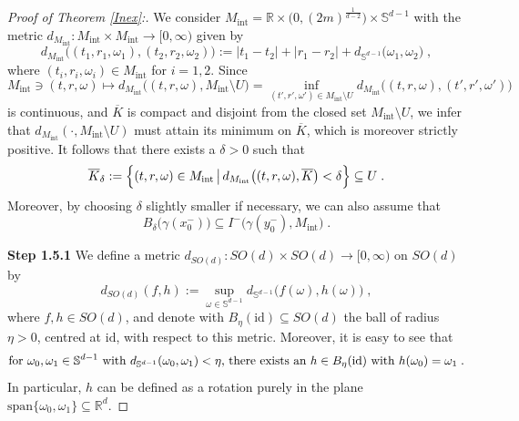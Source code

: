 \documentclass[reqno]{article}
\newcommand{\R}{\mathbb{R}}
\newcommand{\Sd}{\mathbb{S}^{d-1}}
\newcommand{\Mint}{M_{\mathrm{int}}}
\begin{document}
\begin{proof}[Proof of Theorem \ref{Inex}:]
We consider $\Mint = \R \times \big(0,(2m)^{\frac{1}{d-2}}\big) \times \Sd$ with the metric $d_{\Mint} : \Mint \times \Mint \to [0,\infty)$ given by
\begin{equation*}
d_{\Mint}\Big((t_1, r_1, \omega_1), (t_2, r_2, \omega_2)\Big) := |t_1 - t_2| + |r_1 - r_2| + d_{\Sd}\big(\omega_1, \omega_2\big) \;,
\end{equation*}
where $(t_i, r_i, \omega_i) \in \Mint$ for $i=1,2$. Since  
\begin{equation*}
\Mint \ni (t,r,\omega) \mapsto d_{\Mint}\big((t,r,\omega),\Mint \setminus U\big) = \inf\limits_{(t',r',\omega') \in \Mint \setminus U} d_{\Mint}\big((t,r,\omega),(t',r',\omega')\big)
\end{equation*}
is continuous, and $\overline{K}$ is compact and disjoint from the closed set $\Mint \setminus U$, we infer that $d_{\Mint}(\cdot, \Mint \setminus U)$ must attain its minimum on $\overline{K}$, which is moreover strictly positive. It follows that there exists a $\delta >0$ such that 
\begin{equation*}
\overline{K}_\delta := \Big{\{} (t,r,\omega) \in \Mint \, \big| \, d_{\Mint}\big((t,r,\omega), \overline{K}\big) < \delta \Big{\}} \subseteq U \;.
\end{equation*}
Moreover, by choosing $\delta $ slightly smaller if necessary, we can also assume that 
\begin{equation}
\label{RestrictionOnDelta}
B_\delta\big(\gamma(x^-_0)\big) \subseteq I^-\big(\gamma(y^-_0),\Mint\big)\;.
\end{equation}
\vspace*{2mm}

\textbf{Step 1.5.1}
We define a metric $d_{SO(d)} : SO(d) \times SO(d) \to [0,\infty)$ on $SO(d)$ by
\begin{equation*}
d_{SO(d)}(f,h) := \sup\limits_{\omega \in \Sd} d_{\Sd}\big(f (\omega), h(\omega)\big)\;,
\end{equation*}
where $f, h  \in SO(d)$, and denote with $B_{\eta}(\mathrm{id}) \subseteq SO(d)$ the ball of radius $\eta >0 $, centred at $\mathrm{id}$, with respect to this metric. Moreover, it is easy to see that 
\begin{equation}
\label{ChooseRotation}
\textnormal{for } \omega_0, \omega_1 \in \Sd \textnormal{ with } d_{\Sd}(\omega_0, \omega_1) < \eta \textnormal{,  there exists an } h \in B_\eta(\mathrm{id})  \textnormal{ with } h(\omega_0) = \omega_1\;. 
\end{equation}
In particular, $h$ can be defined as a rotation purely in the plane $\mathrm{span}\{\omega_0, \omega_1\} \subseteq \R^d$.
\vspace*{2mm}



\end{proof}
\end{document}
